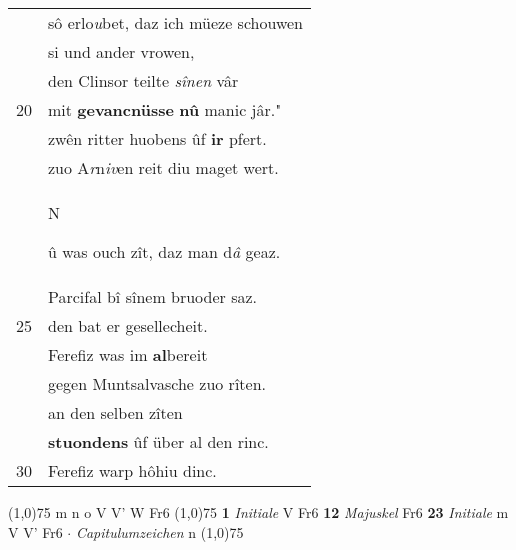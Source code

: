 \documentclass[8pt,a4paper,notitlepage]{article}
\begin{document}
\begin{table}[ht]
\begin{minipage}[t]{0.5\linewidth}
\begin{tabular}{rl}
 & sô erlo\textit{u}bet, daz ich müeze schouwen\\ 
 & si und ander vrowen,\\ 
 & den Clinsor teilte \textit{sînen} vâr\\ 
20 & mit \textbf{gevancnüsse} \textbf{nû} manic jâr."\\ 
 & zwên ritter huobens ûf \textbf{ir} pfert.\\ 
 & zuo A\textit{r}n\textit{iv}en reit diu maget wert.\\ 
 & \begin{large}N\end{large}û was ouch zît, daz man d\textit{â} geaz.\\ 
 & Parcifal bî sînem bruoder saz.\\ 
25 & den bat er gesellecheit.\\ 
 & Ferefiz was im \textbf{al}bereit\\ 
 & gegen Muntsalvasche zuo rîten.\\ 
 & an den selben zîten\\ 
 & \textbf{stuondens} ûf über al den rinc.\\ 
30 & Ferefiz warp hôhiu dinc.\\ 
\end{tabular}
\scriptsize
\line(1,0){75} \newline
m n o V V' W Fr6 \newline
\line(1,0){75} \newline
\textbf{1} \textit{Initiale} V Fr6  \textbf{12} \textit{Majuskel} Fr6  \textbf{23} \textit{Initiale} m V V' Fr6   $\cdot$ \textit{Capitulumzeichen} n  \newline
\line(1,0){75} \newline

\end{minipage}
\end{table}
\end{document}
